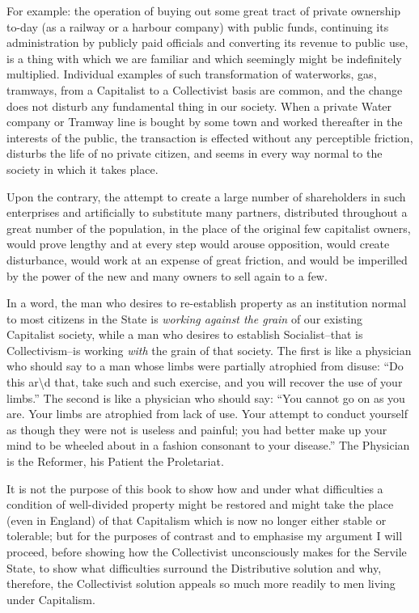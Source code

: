 \documentclass{book}
\begin{document}
For example: the operation of buying out some great tract of private ownership to-day (as a railway or a harbour company) with public funds, continuing its administration by publicly paid officials and converting its revenue to public use, is a thing with which we are familiar and which seemingly might be indefinitely multiplied. Individual examples of such transformation of waterworks, gas, tramways, from a Capitalist to a Collectivist basis are common, and the change does not disturb any fundamental thing in our society. When a private Water company or Tramway line is bought by some town and worked thereafter in the interests of the public, the transaction is effected without any perceptible friction, disturbs the life of no private citizen, and seems in every way normal to the society in which it takes place.

Upon the contrary, the attempt to create a large number of shareholders in such enterprises and artificially to substitute many partners, distributed throughout a great number of the population, in the place of the original few capitalist owners, would prove lengthy and at every step would arouse opposition, would create disturbance, would work at an expense of great friction, and would be imperilled by the power of the new and many owners to sell again to a few.

In a word, the man who desires to re-establish property as an institution normal to most citizens in the State is \emph{working against the grain} of our existing Capitalist society, while a man who desires to establish Socialist–that is Collectivism–is working \emph{with} the grain of that society. The first is like a physician who should say to a man whose limbs were partially atrophied from disuse: “Do this ar\textbackslash{}d that, take such and such exercise, and you will recover the use of your limbs.” The second is like a physician who should say: “You cannot go on as you are. Your limbs are atrophied from lack of use. Your attempt to conduct yourself as though they were not is useless and painful; you had better make up your mind to be wheeled about in a fashion consonant to your disease.” The Physician is the Reformer, his Patient the Proletariat.

It is not the purpose of this book to show how and under what difficulties a condition of well-divided property might be restored and might take the place (even in England) of that Capitalism which is now no longer either stable or tolerable; but for the purposes of contrast and to emphasise my argument I will proceed, before showing how the Collectivist unconsciously makes for the Servile State, to show what difficulties surround the Distributive solution and why, therefore, the Collectivist solution appeals so much more readily to men living under Capitalism.
\end{document}
